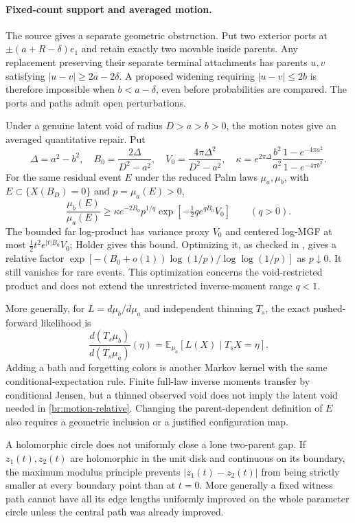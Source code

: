 \documentclass[11pt,a4paper]{article}
\theoremstyle{definition}
\theoremstyle{remark}
\numberwithin{equation}{section}
\begin{document}
\paragraph{Fixed-count support and averaged motion.}
The source  gives a separate
geometric obstruction. Put two exterior ports at
$\pm(a+R-\delta)e_1$ and retain exactly two movable inside parents.
Any replacement preserving their separate terminal attachments has
parents $u,v$ satisfying $|u-v|\ge2a-2\delta$.
A proposed widening requiring $|u-v|\le2b$ is therefore impossible
when $b<a-\delta$, even before probabilities are compared.
The ports and paths admit open perturbations.

Under a genuine latent void of radius $D>a>b>0$, the motion notes
give an averaged quantitative repair. Put
\[
 \Delta=a^2-b^2,\quad B_0=\frac{2\Delta}{D^2-a^2},\quad
 V_0=\frac{4\pi\Delta^2}{D^2-a^2},\quad
 \kappa=e^{2\pi\Delta}\frac{b^2}{a^2}
                    \frac{1-e^{-4\pi a^2}}{1-e^{-4\pi b^2}}.
\]
For the same residual event $E$ under the reduced Palm laws
$\mu_a,\mu_b$, with $E\subset\{X(B_D)=0\}$ and $p=\mu_a(E)>0$,
\begin{equation}\label{br:motion-relative}
 \frac{\mu_b(E)}{\mu_a(E)}
 \ge\kappa e^{-2B_0}p^{1/q}
             \exp[-\tfrac12q e^{qB_0}V_0]\qquad(q>0).
\end{equation}
The bounded far log-product has variance proxy $V_0$ and centered
log-MGF at most $\tfrac12t^2e^{|t|B_0}V_0$; Holder gives this bound.
Optimizing it, as checked in
, gives a relative factor
$\exp[-(B_0+o(1))\log(1/p)/\log\log(1/p)]$ as $p\downarrow0$.
It still vanishes for rare events. This optimization concerns the
void-restricted product and does not extend the unrestricted
inverse-moment range $q<1$.

More generally, for $L=d\mu_b/d\mu_a$ and independent thinning $T_s$,
the exact pushed-forward likelihood is
\[
 \frac{d(T_s\mu_b)}{d(T_s\mu_a)}(\eta)
       =\mathbb E_{\mu_a}[L(X)\mid T_sX=\eta].
\]
Adding a bath and forgetting colors is another Markov kernel with
the same conditional-expectation rule. Finite full-law inverse moments
transfer by conditional Jensen, but a thinned observed void does not
imply the latent void needed in \eqref{br:motion-relative}.
Changing the parent-dependent definition of $E$ also requires a
geometric inclusion or a justified configuration map.

A holomorphic circle does not uniformly close a lone two-parent gap.
If $z_1(t),z_2(t)$ are holomorphic in the unit disk and continuous on
its boundary, the maximum modulus principle prevents
$|z_1(t)-z_2(t)|$ from being strictly smaller at every boundary point
than at $t=0$.  More generally a fixed witness path cannot have all
its edge lengths uniformly improved on the whole parameter circle
unless the central path was already improved.
\end{document}
